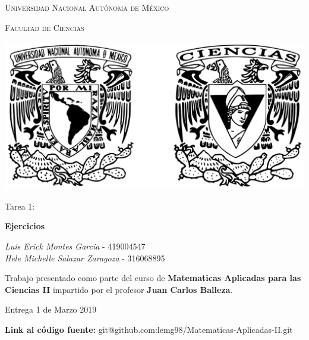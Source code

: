 \documentclass[10pt,letterpaper,fleqn]{article}
\begin{document}
\begin{titlepage}
    \centering

    {\scshape\LARGE Universidad Nacional Autónoma de México \par}

    \vspace{1cm}
    {\scshape\Large Facultad de Ciencias\par}
    \vspace{1.5cm}

    \begin{center}
        \includegraphics[scale=.1]{assets/img/logo.png}
    \end{center}

    \vspace{.8 cm}

    {\LARGE Tarea 1: \par}
    {\huge\bfseries Ejercicios \par}

    \vspace{0.5cm}
    \large{\itshape{Luis Erick Montes Garcia}} \small{ - 419004547}\\
    \large{\itshape{Hele Michelle Salazar Zaragoza}} \small{ - 316068895}


    \vfill

    Trabajo presentado como parte del curso de
    \textbf{Matematicas Aplicadas para las Ciencias II}
    impartido por el profesor \textbf{Juan Carlos Balleza}. \par
    \vspace{0.1cm}
    {\large Entrega 1 de Marzo 2019 \par}
    \footnotesize{\textbf{Link al código fuente:} git@github.com:lemg98/Matematicas-Aplicadas-II.git}
\end{titlepage}
\end{document}
